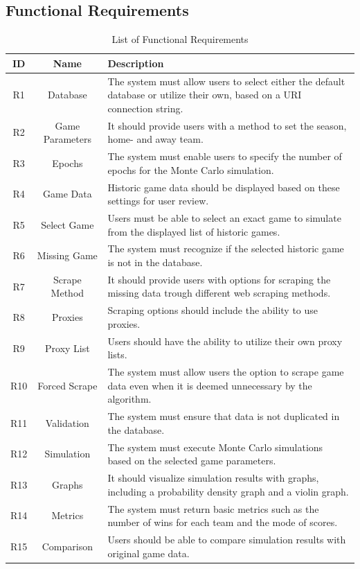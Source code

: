 \documentclass{thesis-ekf}
\theoremstyle{definition}
\theoremstyle{remark}
\begin{document}
\subsection{Functional Requirements}
\begin{table}[H]
	\centering
	\begin{tabular}{|c|c|>{\raggedright\arraybackslash}p{10cm}|}
		\hline
		\textbf{ID} & \textbf{Name} & \textbf{Description} \\ 
		\hline
		R1	& Database & The system must allow users to select either the default database or utilize their own, based on a URI connection string. \\ 
		\hline
		R2	& Game Parameters & It should provide users with a method to set the season, home- and away team. \\ 
		\hline
		R3	& Epochs & The system must enable users to specify the number of epochs for the Monte Carlo simulation. \\ 
		\hline
		R4	& Game Data & Historic game data should be displayed based on these settings for user review. \\ 
		\hline
		R5	& Select Game & Users must be able to select an exact game to simulate from the displayed list of historic games. \\ 
		\hline
		R6	& Missing Game & The system must recognize if the selected historic game is not in the database. \\ 
		\hline
		R7	& Scrape Method & It should provide users with options for scraping the missing data trough different web scraping methods. \\ 
		\hline
		R8	& Proxies & Scraping options should include the ability to use proxies. \\ 
		\hline
		R9	& Proxy List & Users should have the ability to utilize their own proxy lists. \\ 
		\hline
		R10	& Forced Scrape & The system must allow users the option to scrape game data even when it is deemed unnecessary by the algorithm. \\ 
		\hline
		R11	& Validation & The system must ensure that data is not duplicated in the database. \\ 
		\hline
		R12	& Simulation & The system must execute Monte Carlo simulations based on the selected game parameters. \\ 
		\hline
		R13	& Graphs & It should visualize simulation results with graphs, including a probability density graph and a violin graph. \\ 
		\hline
		R14	& Metrics & The system must return basic metrics such as the number of wins for each team and the mode of scores. \\ 
		\hline
		R15	& Comparison & Users should be able to compare simulation results with original game data. \\ 
		\hline
	\end{tabular}
	\caption{List of Functional Requirements}
	\label{table-funct-req}
\end{table}
\end{document}
